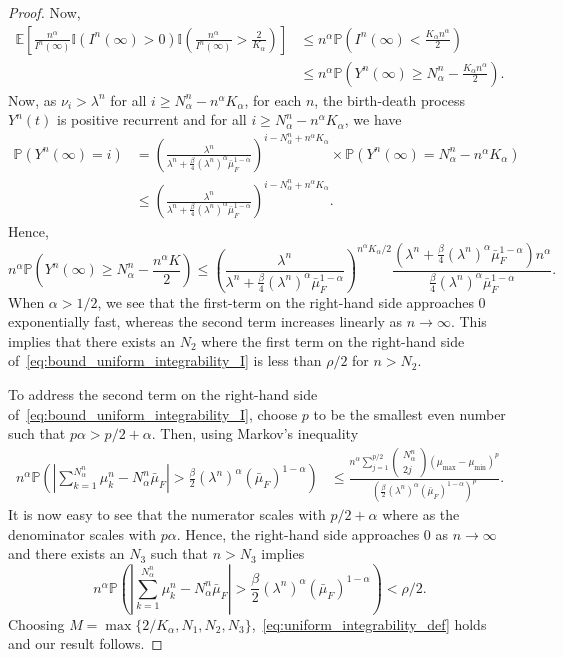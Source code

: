\documentclass[10pt,a4paper]{amsart}
\newcommand{\EE}{\mathbb{E}}
\newcommand{\II}{\mathbb{I}}
\newcommand{\PP}{\mathbb{P}}
\begin{document}
\begin{proof}
Now, 
\begin{align*}
   \EE\left[\frac{n^{\alpha}}{I^n(\infty)}\II(I^n(\infty)>0)\II\left(\frac{n^{\alpha}}{I^n(\infty)}>\frac{2}{K_\alpha}\right)\right]
   & 
   \leq n^\alpha \PP\left(I^n(\infty)<\frac{K_\alpha n^{\alpha}}{2}\right)
  \\
  &
  \leq n^\alpha \PP\left(Y^n(\infty)\geq N^n_\alpha-\frac{K_\alpha n^{\alpha}}{2}\right).
\end{align*}
Now, as $\nu_i> \lambda^n$ for all $i\geq N^n_\alpha-n^{\alpha}K_\alpha$, for each $n$, the birth-death process $Y^n(t)$ is positive recurrent and for all $i\geq N^n_\alpha-n^{\alpha}K_\alpha$, we have
\begin{align*}
\PP(Y^n(\infty)=i)
&=\left(\frac{\lambda^n}{\lambda^n+\frac{\beta}{4}(\lambda^n)^{\alpha}\bar{\mu}_F^{1-\alpha}}\right)^{i-N^n_\alpha+n^\alpha K_\alpha}
\times \PP(Y^n(\infty)=N^n_\alpha-n^\alpha K_\alpha)
\\
&\leq \left(\frac{\lambda^n}{\lambda^n+\frac{\beta}{4}(\lambda^n)^{\alpha}\bar{\mu}_F^{1-\alpha}}\right)^{i-N^n_\alpha+n^\alpha K_\alpha}.
\end{align*}
Hence, 
\[
n^\alpha\PP\left(Y^n(\infty)
\geq 
N^n_\alpha-\frac{ n^\alpha K}{2}\right)
\leq \left(\frac{\lambda^n}{\lambda^n+\frac{\beta}{4}(\lambda^n)^{\alpha}\bar{\mu}_F^{1-\alpha}}\right)^{n^\alpha K_\alpha/2}\frac{(\lambda^n+\frac{\beta}{4}(\lambda^n)^{\alpha}\bar{\mu}_F^{1-\alpha})n^\alpha}{\frac{\beta}{4}(\lambda^n)^{\alpha}\bar{\mu}_F^{1-\alpha}}.
\]
When $\alpha>1/2$, we see that the first-term on the right-hand side approaches 0 exponentially fast, whereas the second term increases linearly as $n\to \infty$. This implies that there exists an $N_2$ where the first term on the right-hand side of~\eqref{eq:bound_uniform_integrability_I} is less than $\rho/2$ for $n>N_2$.

To address the second term on the right-hand side of~\eqref{eq:bound_uniform_integrability_I}, choose $p$ to be the smallest even number such that $p\alpha>p/2+\alpha$. Then, using Markov's inequality
\begin{align*}
    n^{\alpha}\PP\left(\left|\sum_{k=1}^{N^n_\alpha}\mu_k^n-N^n_\alpha\bar{\mu}_F\right|> \frac{\beta}{2}(\lambda^n)^\alpha(\bar{\mu}_F)^{1-\alpha}\right)&\leq \frac{n^\alpha \sum_{j=1}^{p/2}
    \left(\begin{array}{c}N^n_\alpha\\2j\end{array}\right)(\mu_{\max}-\mu_{\min})^p}{\left(\frac{\beta}{2}(\lambda^n)^\alpha(\bar{\mu}_F)^{1-\alpha}\right)^p}.
\end{align*}
It is now easy to see that the numerator scales with $p/2+\alpha$ where as the denominator scales with $p\alpha$. Hence, the right-hand side approaches 0 as $n\to \infty$ and there exists an $N_3$ such that  $n>N_3$ implies 
\[
n^{\alpha}\PP\left(\left|\sum_{k=1}^{N^n_\alpha}\mu_k^n-N^n_\alpha\bar{\mu}_F\right|> \frac{\beta}{2}(\lambda^n)^\alpha(\bar{\mu}_F)^{1-\alpha}\right)<\rho/2.
\]
 Choosing $M=\max\{2/K_\alpha, N_1, N_2, N_3\}$,~\eqref{eq:uniform_integrability_def} holds and our result follows. \end{proof}
\end{document}

